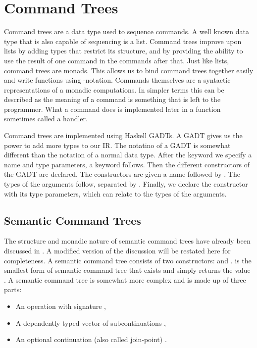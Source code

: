\section{\label{section:commandtree}Command Trees}
Command trees are a data type used to sequence commands. A well known data type that is also capable of sequencing is a list. Command trees improve upon lists by adding types that restrict its structure, and by providing the ability to use the result of one command in the commands after that. Just like lists, command trees are monads. This allows us to bind command trees together easily and write functions using -notation. Commands themselves are a syntactic representations of a monadic computations. In simpler terms this can be described as the meaning of a command is something that is left to the programmer. What a command does is implemented later in a function sometimes called a handler.

Command trees are implemented using Haskell \acp{GADT}. A \ac{GADT} gives us the power to add more types to our \ac{IR}. The notatino of a \ac{GADT} is somewhat different than the notation of a normal data type. After the  keyword we specify a name and type parameters, a  keyword follows. Then the different constructors of the \ac{GADT} are declared. The constructors are given a name followed by \icode{::}. The types of the arguments follow, separated by \icode{->}. Finally, we declare the constructor with its type parameters, which can relate to the types of the arguments.

\subsection{\label{subsection:semantree}Semantic Command Trees}
The structure and monadic nature of semantic command trees have already been discussed in . A modified version of the discussion will be restated here for completeness. A semantic command tree consists of two constructors:  and .  is the smallest form of semantic command tree that exists and simply returns the value . A  semantic command tree is somewhat more complex and is made up of three parts:

\begin{itemize}
\item An operation  with signature ,
\item A dependently typed vector of subcontinuations ,
\item An optional continuation (also called join-point) .
\end{itemize}

